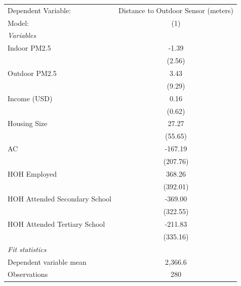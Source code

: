 
\begingroup
\centering
\begin{tabular}{lc}
   \tabularnewline \midrule \midrule
   Dependent Variable:           & Distance to Outdoor Sensor (meters)\\  
   Model:                        & (1)\\  
   \midrule
   \emph{Variables}\\
   Indoor PM2.5                  & -1.39\\   
                                 & (2.56)\\   
   Outdoor PM2.5                 & 3.43\\   
                                 & (9.29)\\   
   Income (USD)                  & 0.16\\   
                                 & (0.62)\\   
   Housing Size                  & 27.27\\   
                                 & (55.65)\\   
   AC                            & -167.19\\   
                                 & (207.76)\\   
   HOH Employed                  & 368.26\\   
                                 & (392.01)\\   
   HOH Attended Secondary School & -369.00\\   
                                 & (322.55)\\   
   HOH Attended Tertiary School  & -211.83\\   
                                 & (335.16)\\   
   \midrule
   \emph{Fit statistics}\\
   Dependent variable mean       & 2,366.6\\  
   Observations                  & 280\\  
   \midrule \midrule
\end{tabular}
\par\endgroup


